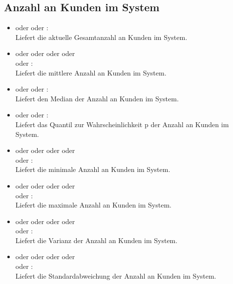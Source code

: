 \subsection{Anzahl an Kunden im System}

\begin{itemize}

\item
{} oder  oder :\\
Liefert die aktuelle Gesamtanzahl an Kunden im System.

\item
{} oder  oder  oder  oder\\
 oder :\\
Liefert die mittlere Anzahl an Kunden im System.

\item
{} oder  oder :\\	
Liefert den Median der Anzahl an Kunden im System.

\item
{} oder  oder :\\
Liefert das Quantil zur Wahrscheinlichkeit p der Anzahl an Kunden im System.

\item
{} oder  oder  oder  oder\\
 oder :\\
Liefert die minimale Anzahl an Kunden im System.

\item
{} oder  oder  oder  oder\\
 oder :\\
Liefert die maximale Anzahl an Kunden im System.

\item
{} oder  oder  oder  oder\\
 oder :\\
Liefert die Varianz der Anzahl an Kunden im System.

\item
{} oder  oder  oder  oder\\
 oder :\\
Liefert die Standardabweichung der Anzahl an Kunden im System.


\end{itemize}
